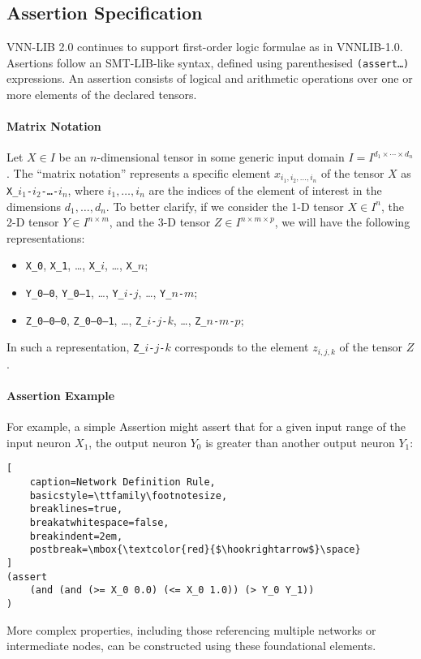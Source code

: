 \subsection{Assertion Specification}
VNN-LIB 2.0 continues to support first-order logic formulae as in VNNLIB-1.0. Asertions follow an SMT-LIB-like syntax, defined using parenthesised 
\texttt{(assert\ldots)} expressions. An assertion consists of logical and arithmetic operations over one or more elements of the declared tensors.

\paragraph{Matrix Notation}
Let $X \in I$ be an $n$-dimensional tensor in some generic input domain $I = I^{d_1 \times \cdots \times d_n}$. The ``matrix notation'' represents a specific 
element $x_{i_1, i_2, \dots, i_n}$ of the tensor $X$ as \texttt{X\_$i_1$-$i_2$-\dots-$i_n$}, where $i_1, \dots, i_n$ are the indices of the element of interest in the 
dimensions $d_1, \dots, d_n$. To better clarify, if we consider the 1-D tensor $X \in I^n$, the 2-D tensor $Y \in I^{n \times m}$, and the 3-D tensor 
$Z \in I^{n \times m \times p}$, we will have the following representations:
\begin{itemize}
    \item \texttt{X\_0}, \texttt{X\_1}, \dots, \texttt{X\_$i$}, \dots, \texttt{X\_$n$};
    \item \texttt{Y\_0--0}, \texttt{Y\_0--1}, \dots, \texttt{Y\_$i$-$j$}, \dots, \texttt{Y\_$n$-$m$};
    \item \texttt{Z\_0--0--0}, \texttt{Z\_0--0--1}, \dots, \texttt{Z\_$i$-$j$-$k$}, \dots, \texttt{Z\_$n$-$m$-$p$};
\end{itemize}
In such a representation, \texttt{Z\_$i$-$j$-$k$} corresponds to the element $z_{i,j,k}$ of the tensor $Z$. 

\paragraph{Assertion Example}
For example, a simple Assertion might assert that for a given input range of the input neuron $X_1$, the output neuron $Y_0$ 
is greater than another output neuron $Y_1$:
\begin{lstlisting}[
    caption=Network Definition Rule, 
    basicstyle=\ttfamily\footnotesize,
    breaklines=true,               
    breakatwhitespace=false,       
    breakindent=2em,                
    postbreak=\mbox{\textcolor{red}{$\hookrightarrow$}\space} 
]
(assert 
	(and (and (>= X_0 0.0) (<= X_0 1.0)) (> Y_0 Y_1))
)
\end{lstlisting}
More complex properties, including those referencing multiple networks or intermediate nodes, can be constructed using these foundational elements.
